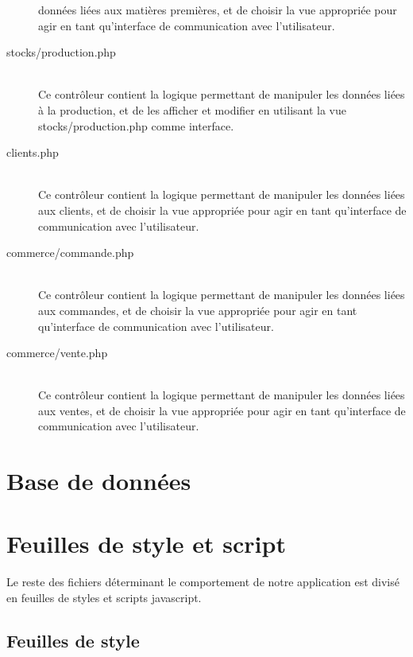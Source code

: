 \begin{description}
                données liées aux matières premières, et de choisir la vue
                appropriée pour agir en tant qu'interface de communication
                avec l'utilisateur.
            \item[stocks/production.php]\hfill \\
                Ce contrôleur contient la logique permettant de manipuler les
                données liées à la production, et de les afficher et modifier
                en utilisant la vue stocks/production.php comme interface.
            \item[clients.php]\hfill \\
                Ce contrôleur contient la logique permettant de manipuler les
                données liées aux clients, et de choisir la vue appropriée
                pour agir en tant qu'interface de communication avec
                l'utilisateur.
            \item[commerce/commande.php]\hfill \\
                Ce contrôleur contient la logique permettant de manipuler les
                données liées aux commandes, et de choisir la vue appropriée
                pour agir en tant qu'interface de communication avec
                l'utilisateur.
            \item[commerce/vente.php]\hfill \\
                Ce contrôleur contient la logique permettant de manipuler les
                données liées aux ventes, et de choisir la vue appropriée pour
                agir en tant qu'interface de communication avec l'utilisateur.
        \end{description}

\section{Base de données}

\section{Feuilles de style et script}
    \paragraph{}
        Le reste des fichiers déterminant le comportement de notre application
        est divisé en feuilles de styles et scripts javascript.
    \subsection{Feuilles de style}
